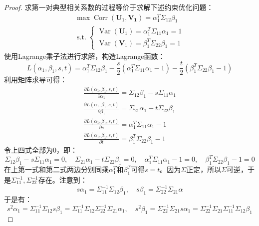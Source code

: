\begin{proof}
	求第一对典型相关系数的过程等价于求解下述约束优化问题：
	\begin{gather*}
		\max\operatorname{Corr}(\mathbf{U}_1,\mathbf{V_1})=\alpha_1^T\Sigma_{12}\beta_1 \\
		\operatorname{s.t.}
		\begin{cases}
			\operatorname{Var}(\mathbf{U}_1)=\alpha_1^T\Sigma_{11}\alpha_1=1 \\
			\operatorname{Var}(\mathbf{V}_1)=\beta_1^T\Sigma_{22}\beta_1=1
		\end{cases}
	\end{gather*}
	使用Lagrange乘子法进行求解，构造Lagrange函数：
	\begin{equation*}
		L(\alpha_1,\beta_1,s,t)=\alpha_1^T\Sigma_{12}\beta_1-\frac{s}{2}(\alpha_1^T\Sigma_{11}\alpha_1-1)-\frac{t}{2}(\beta_1^T\Sigma_{22}\beta_1-1)
	\end{equation*}
	利用矩阵求导可得：
	\begin{gather*}
		\frac{\partial L(\alpha_1,\beta_1,s,t)}{\partial\alpha_1}=\Sigma_{12}\beta_1-s\Sigma_{11}\alpha_1 \\
		\frac{\partial L(\alpha_1,\beta_1,s,t)}{\partial\beta_1}=\Sigma_{21}\alpha_1-t\Sigma_{22}\beta_1 \\
		\frac{\partial L(\alpha_1,\beta_1,s,t)}{\partial s}=\alpha_1^T\Sigma_{11}\alpha_1-1 \\
		\frac{\partial L(\alpha_1,\beta_1,s,t)}{\partial t}=\beta_1^T\Sigma_{22}\beta_1-1
	\end{gather*}
	令上四式全部为$0$，即：
	\begin{equation*}
		\Sigma_{12}\beta_1-s\Sigma_{11}\alpha_1=0,\quad\Sigma_{21}\alpha_1-t\Sigma_{22}\beta_1=0,\quad\alpha_1^T\Sigma_{11}\alpha_1-1=0,\quad\beta_1^T\Sigma_{22}\beta_1-1=0
	\end{equation*}
	在上第一式和第二式两边分别同乘$\alpha_1^T$和$\beta_1^T$可得$s=t$。因为$\Sigma$正定，所以$\Sigma$可逆，于是$\Sigma_{11}^{-1},\Sigma_{22}^{-1}$存在。注意到：
	\begin{equation*}
		s\alpha_1=\Sigma_{11}^{-1}\Sigma_{12}\beta_1,\quad s\beta_1=\Sigma_{22}^{-1}\Sigma_{21}\alpha
	\end{equation*}
	于是有：
	\begin{equation*}
		s^2\alpha_1=\Sigma_{11}^{-1}\Sigma_{12}s\beta_1=\Sigma_{11}^{-1}\Sigma_{12}\Sigma_{22}^{-1}\Sigma_{21}\alpha_1,\quad
		s^2\beta_1=\Sigma_{22}^{-1}\Sigma_{21}s\alpha_1=\Sigma_{22}^{-1}\Sigma_{21}\Sigma_{11}^{-1}\Sigma_{12}\beta_1
	\end{equation*}

\end{proof}
